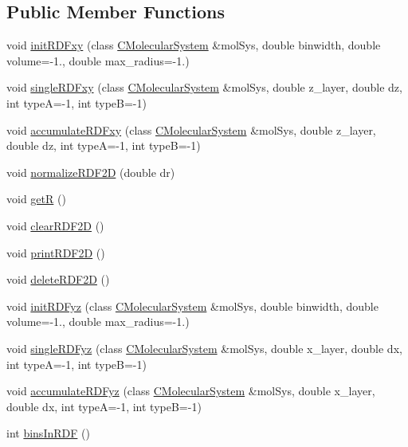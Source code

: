 \subsection*{Public Member Functions}
\begin{DoxyCompactItemize}
\item 
void \mbox{\hyperlink{classRdf2D_a767f006de6412394a59f1cae5f7f6b35}{init\+R\+D\+Fxy}} (class \mbox{\hyperlink{classCMolecularSystem}{C\+Molecular\+System}} \&mol\+Sys, double binwidth, double volume=-\/1., double max\+\_\+radius=-\/1.)
\item 
void \mbox{\hyperlink{classRdf2D_afc5ff73aa9c126184e94ee3abfc14ff4}{single\+R\+D\+Fxy}} (class \mbox{\hyperlink{classCMolecularSystem}{C\+Molecular\+System}} \&mol\+Sys, double z\+\_\+layer, double dz, int typeA=-\/1, int typeB=-\/1)
\item 
void \mbox{\hyperlink{classRdf2D_a6c716851d80fd2a7dcfefd219892d87b}{accumulate\+R\+D\+Fxy}} (class \mbox{\hyperlink{classCMolecularSystem}{C\+Molecular\+System}} \&mol\+Sys, double z\+\_\+layer, double dz, int typeA=-\/1, int typeB=-\/1)
\item 
void \mbox{\hyperlink{classRdf2D_aaf6d00ec728e8c694ed2932332691c0d}{normalize\+R\+D\+F2D}} (double dr)
\item 
void \mbox{\hyperlink{classRdf2D_a3c8153b303733b7e5d320f9b20f37b32}{getR}} ()
\item 
void \mbox{\hyperlink{classRdf2D_a9658a9bb2229afda0d743bdc05a27411}{clear\+R\+D\+F2D}} ()
\item 
void \mbox{\hyperlink{classRdf2D_aae00c1526117f6ac63d2c13354b6c404}{print\+R\+D\+F2D}} ()
\item 
void \mbox{\hyperlink{classRdf2D_a8008421c8aedff5887160b455879d36b}{delete\+R\+D\+F2D}} ()
\item 
void \mbox{\hyperlink{classRdf2D_adf8c5b9d02268de9ee5ebab8cfe7f3df}{init\+R\+D\+Fyz}} (class \mbox{\hyperlink{classCMolecularSystem}{C\+Molecular\+System}} \&mol\+Sys, double binwidth, double volume=-\/1., double max\+\_\+radius=-\/1.)
\item 
void \mbox{\hyperlink{classRdf2D_a4e77d415c344954480a121f79a4aab6b}{single\+R\+D\+Fyz}} (class \mbox{\hyperlink{classCMolecularSystem}{C\+Molecular\+System}} \&mol\+Sys, double x\+\_\+layer, double dx, int typeA=-\/1, int typeB=-\/1)
\item 
void \mbox{\hyperlink{classRdf2D_a26d388ff4f8b626c22fa3ea12332e1d7}{accumulate\+R\+D\+Fyz}} (class \mbox{\hyperlink{classCMolecularSystem}{C\+Molecular\+System}} \&mol\+Sys, double x\+\_\+layer, double dx, int typeA=-\/1, int typeB=-\/1)
\item 
int \mbox{\hyperlink{classRdf2D_ad5d65146becc5d7703c783600d924f44}{bins\+In\+R\+DF}} ()
\end{DoxyCompactItemize}
